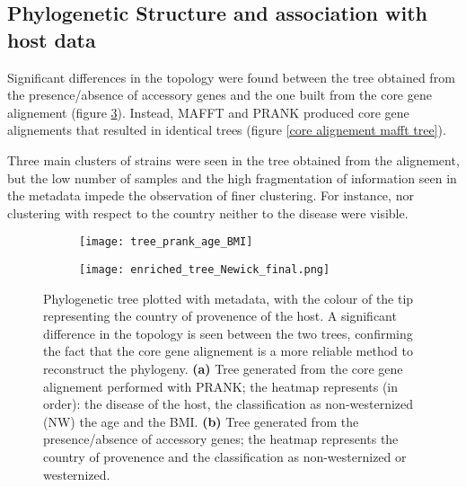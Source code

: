\subsection*{Phylogenetic Structure and association with host data}
\graphicspath{{images/phylogeneticStructureHostData/}}




Significant differences in the topology were found between the tree obtained from the presence/absence of accessory genes
and the one built from the core gene alignement (figure \ref{fig:phylogenetic trees}). Instead,
MAFFT and PRANK produced core gene alignements that resulted in identical trees
(figure \ref{core alignement mafft tree}). 

Three main clusters of strains were seen in the tree obtained from the alignement, but the low number of samples and the high fragmentation of
information seen in the metadata impede the observation of finer clustering. 
For instance, nor clustering with respect to the country neither to the disease were visible.


\begin{figure}[h!]
    \centering
    \begin{subfigure}[b]{0.8\textwidth}
        \centering
        \texttt{[image: tree\_prank\_age\_BMI]}
        \caption{}
        \label{fig:core alignment prank tree}
    \end{subfigure}
    \begin{subfigure}[b]{0.7\textwidth}
        \centering
        \texttt{[image: enriched\_tree\_Newick\_final.png]}
        \caption{}
        \label{fig:presence absence tree}
    \end{subfigure}
       \caption{\footnotesize{Phylogenetic tree plotted with metadata, with the colour of the tip representing
       the country of provenence of the host. A significant difference in the topology is seen between the two trees, confirming the fact
       that the core gene alignement is a more reliable method to reconstruct the phylogeny.
       \textbf{(a)} Tree generated from the core gene alignement
       performed with PRANK; the heatmap represents (in order): the disease of the host, the classification as non-westernized (NW)
       the age and the BMI. \textbf{(b)} Tree generated from the presence/absence of accessory genes; the heatmap represents
       the country of provenence and the classification as non-westernized or westernized.}}
       \label{fig:phylogenetic trees}
\end{figure}






